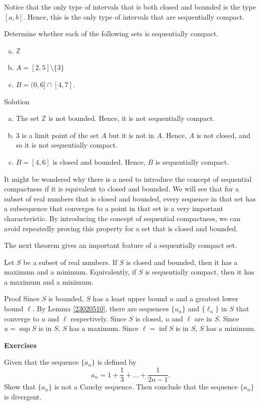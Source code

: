  Notice that the only type of intervals that is both closed and bounded is the type $[a, b]$. Hence, this is the only type of  intervals that are sequentially compact.
 \begin{example}{}
 Determine whether each of the following sets is sequentially compact.
 \begin{enumerate} [(a)]
  \item $\mathbb{Z}$
  \item 
 $A=[2, 5]\setminus\{3\}$

 
 \item  $B=(0, 6]\cap [4, 7]$.
 \end{enumerate}
 \end{example}
 \begin{solution}{Solution}
  \begin{enumerate}[(a)]
  \item The set $\mathbb{Z}$ is not bounded. Hence, it is not  sequentially compact.
  \item  $3$ is a limit point of the set $A$ but it is not in $A$. Hence, $A$ is not closed, and so it is not  sequentially compact. 
  \item  $B=[4, 6]$ is closed and bounded. Hence, $B$ is sequentially compact.
  \end{enumerate}
 \end{solution}
 
It might be wondered why there is a need to introduce the concept of sequential compactness if it is equivalent to closed and bounded.    We will see that for a subset of real numbers that is closed and bounded, every sequence in that set has a subsequence that converges to a point in that set  is   a very important characteristic. By introducing the concept of sequential compactness, we can avoid repeatedly proving this property for a set that is closed and bounded.

The next theorem gives an important feature of a sequentially compact set.
\begin{theorem}[label=23020908]{}Let $S$ be a subset of real numbers. If $S$ is closed and bounded, then it has a maximum and a minimum. Equivalently, if $S$ is sequentially compact, then it has a maximum and a minimum.
\end{theorem}
\begin{myproof}{Proof}
 Since $S$ is bounded, $S$ has a least upper bound $u$ and a greatest lower bound $\ell$. By Lemma \ref{23020510}, there are sequences $\{u_n\}$ and $\{\ell_n\}$ in $S$ that converge to $u$ and $\ell$ respectively. Since $S$ is closed, $u$ and $\ell$ are in $S$. Since $u=\sup S$ is in $S$, $S$ has a maximum. Since $\ell=\inf S$ is in $S$, $S$ has a minimum.
\end{myproof}
\vp
\noindent
{\bf \large Exercises  \thesection}
\setcounter{myquestion}{1}
 \begin{question}{\themyquestion} 
Given that the sequence $\{a_n\}$ is defined by
\[a_n=1+\frac{1}{3}+\ldots+\frac{1}{2n-1}.\]
Show that $\{a_n\}$ is not a Cauchy sequence. Then conclude that the sequence $\{a_n\}$ is divergent.
\end{question}
 
